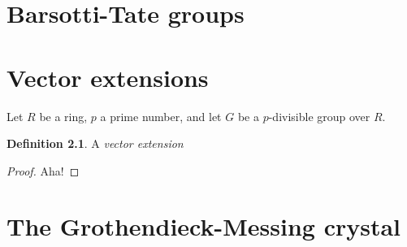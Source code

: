 \documentclass{amsbook}
\theoremstyle{definition}
\newtheorem{definition}{Definition}
\begin{document}
\chapter{Barsotti-Tate groups}

\chapter{Vector extensions}

Let $R$ be a ring, $p$ a prime number, and let $G$ be a $p$-divisible group over
$R$.

\begin{definition}
  A \emph{vector extension}
\end{definition}

\begin{proof}
  Aha!
\end{proof}

\chapter{The Grothendieck-Messing crystal}
\end{document}
